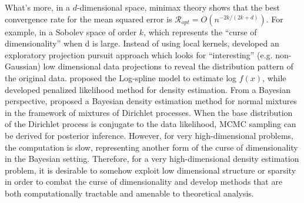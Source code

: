 What’s more, in a $d$-dimensional space, minimax theory shows that the best convergence rate for the mean squared error is $\mathcal{R}_{opt} = O(n^{-2k/(2k+d)})$. 
For example, in a Sobolev space of order $k$, which represents the ``curse of dimensionality'' when d is large. 
Instead of using local kernels, \cite{friedman1984projection} developed an exploratory projection pursuit approach which looks for ``interesting'' (e.g. non-Gaussian) low dimensional data projections to reveal the distribution pattern of the original data. 
 \cite{stone1990large} proposed the Log-spline model to estimate log $f(x)$, while \cite{silverman1982estimation} developed penalized likelihood method for density estimation. 
From a Bayesian perspective, \cite{escobar1995bayesian} proposed a Bayesian density estimation method for normal mixtures in the framework of mixtures of Dirichlet processes. 
When the base distribution of the Dirichlet process is conjugate to the data likelihood, MCMC sampling can be derived for posterior inference. 
However, for very high-dimensional problems, the computation is slow, representing another form of the curse of dimensionality in the Bayesian setting. 
Therefore, for a very high-dimensional density estimation problem, it is desirable to somehow exploit low dimensional structure or sparsity in order to combat the curse of dimensionality and develop methods that are both computationally tractable and amenable to theoretical analysis.

